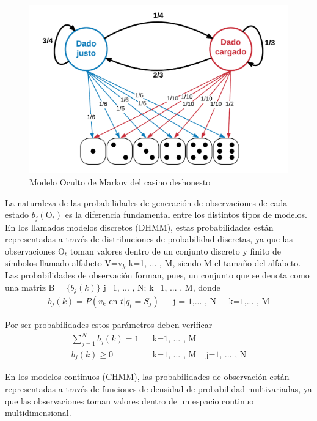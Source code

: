 \begin{figure}[!htp]
\centering
\includegraphics[scale=0.2]{images/hmm_ejemplo.png}
\caption{Modelo Oculto de Markov del casino deshonesto}
\label{fig:hmmejemplo}
\end{figure}


La naturaleza de las probabilidades de generación de observaciones de cada estado $b_j(\mathrm{O}_t)$ es la diferencia fundamental entre los distintos tipos de modelos. En los llamados modelos discretos (DHMM), estas probabilidades están representadas a través de distribuciones de probabilidad discretas, ya que las observaciones $\mathrm{O}_t$ toman valores dentro de un conjunto discreto y finito de símbolos llamado alfabeto V={v$_k$}   k=1, ... , M, siendo M el tamaño del alfabeto. Las probabilidades de observación forman, pues, un conjunto que se denota como una matriz $\mathrm{B}=\{b_j(k)\}$  j=1, ... , N; k=1, ... , M, donde
\begin{align}
b_j(k)=P(v_k\text{ en }t | q_t=S_j)     & & \text{j = 1,... , N }   & \text{ k=1,... , M}
\end{align}

Por ser probabilidades estos parámetros deben verificar
\begin{align}
\sum_{j=1}^{N} b_j(k)=1                 & &  \text{k=1, ... , M} \\
b_j(k) \geq 0      & & \text{k=1, ... , M} &  \text{ j=1, ... , N}
\end{align}

En los modelos continuos (CHMM), las probabilidades de observación están representadas a través de funciones de densidad de probabilidad multivariadas, ya que las observaciones toman valores dentro de un espacio continuo multidimensional. 

